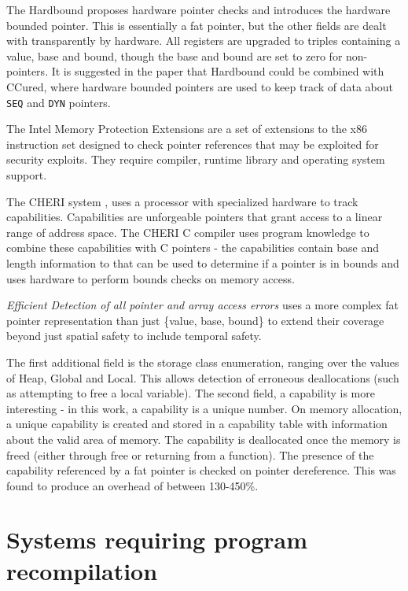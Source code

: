 The Hardbound \cite{devietti2008hardbound} proposes hardware pointer checks and introduces the hardware bounded pointer. This is essentially a fat pointer, but the other fields are dealt with transparently by hardware.
All registers are upgraded to triples containing a value, base and bound, though the base and bound are set to zero for non-pointers.
It is suggested in the paper that Hardbound could be combined with CCured, where hardware bounded pointers are used to keep track of data about \verb!SEQ! and \verb!DYN! pointers.

The Intel Memory Protection Extensions \cite{mpx,intelMpxSpec} are a set of extensions to the x86 instruction set designed to check pointer references that may be exploited for security exploits.
They require compiler, runtime library and operating system support.

The CHERI system \cite{cheri}, uses a processor with specialized hardware to track capabilities. Capabilities are unforgeable pointers that grant access to a linear range of address space.
The CHERI C compiler uses program knowledge to combine these capabilities with C pointers - the capabilities contain base and length information to that can be used to determine if a pointer is in bounds and uses hardware to perform bounds checks on memory access.

\textit{Efficient Detection of all pointer and array access errors} \cite{austin1994efficient} uses a more complex fat pointer representation than just \{value, base, bound\} to extend their coverage beyond just spatial safety to include temporal safety.

The first additional field is the storage class enumeration, ranging over the values of Heap, Global and Local.
This allows detection of erroneous deallocations (such as attempting to free a local variable).
The second field, a capability is more interesting - in this work, a capability is a unique number.
On memory allocation, a unique capability is created and stored in a capability table with information about the valid area of memory.
The capability is deallocated once the memory is freed (either through free or returning from a function).
The presence of the capability referenced by a fat pointer is checked on pointer dereference.
This was found to produce an overhead of between 130-450\%.

\section{Systems requiring program recompilation}


